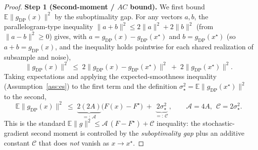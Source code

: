 \begin{proof}
\medskip
\noindent\textbf{Step 1 (Second-moment / $AC$ bound).}
We first bound $\mathbb E\|g_{\mathrm{DP}}(x)\|^2$ by the suboptimality gap. For any vectors $a,b$, the parallelogram-type inequality $\|a+b\|^2\le 2\|a\|^2+2\|b\|^2$ (from $\|a-b\|^2\ge0$) gives, with $a=g_{\mathrm{DP}}(x)-g_{\mathrm{DP}}(x^\star)$ and $b=g_{\mathrm{DP}}(x^\star)$ (so $a+b=g_{\mathrm{DP}}(x)$, and the inequality holds pointwise for each shared realization of subsample and noise),
\[
\big\|g_{\mathrm{DP}}(x)\big\|^2\;\le\;2\big\|g_{\mathrm{DP}}(x)-g_{\mathrm{DP}}(x^\star)\big\|^2\;+\;2\big\|g_{\mathrm{DP}}(x^\star)\big\|^2.
\]
Taking expectations and applying the expected-smoothness inequality (Assumption~\ref{ass:es}) to the first term and the definition $\sigma_\star^2=\mathbb E\|g_{\mathrm{DP}}(x^\star)\|^2$ to the second,
\begin{equation}\label{eq:AC}
\mathbb E\big\|g_{\mathrm{DP}}(x)\big\|^2\;\le\;\underbrace{2(2A)}_{=:\,\mathcal A}\big(F(x)-F^\star\big)\;+\;\underbrace{2\sigma_\star^2}_{=:\,\mathcal C}\,,
\qquad \mathcal A=4A,\ \ \mathcal C=2\sigma_\star^2.
\end{equation}
This is the standard $\mathbb E\|g\|^2\le \mathcal A\,(F-F^\star)+\mathcal C$ inequality: the stochastic-gradient second moment is controlled by the \emph{suboptimality gap} plus an additive constant $\mathcal C$ that does \emph{not} vanish as $x\to x^\star$.


\end{proof}
